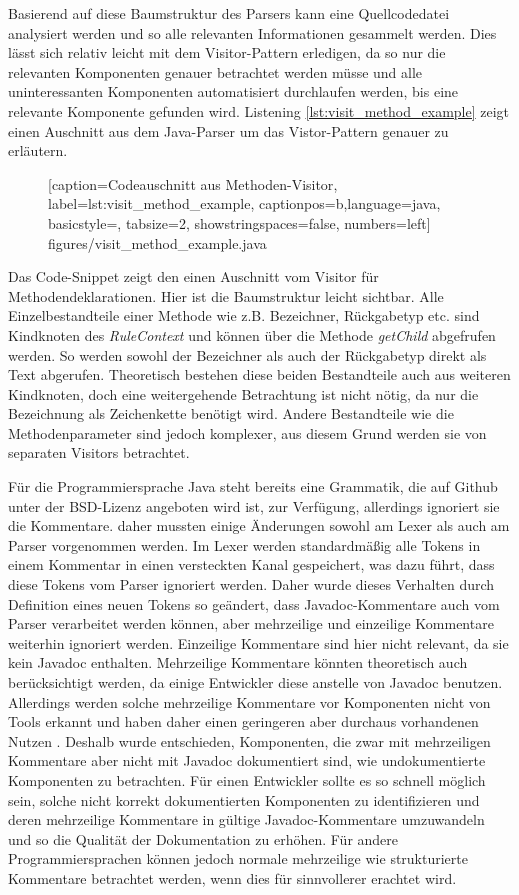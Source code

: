 Basierend auf diese Baumstruktur des Parsers kann eine Quellcodedatei analysiert werden und so alle relevanten Informationen gesammelt werden. Dies lässt sich relativ leicht mit dem Visitor-Pattern erledigen, da so nur die relevanten  Komponenten genauer betrachtet werden müsse und alle uninteressanten Komponenten automatisiert durchlaufen werden, bis eine relevante Komponente gefunden wird. Listening \ref{lst:visit_method_example} zeigt einen Auschnitt aus dem Java-Parser um das Vistor-Pattern genauer zu erläutern. 
		\begin{figure} [htbp]
			
			[caption={Codeauschnitt aus  Methoden-Visitor},
			label={lst:visit_method_example},
			captionpos=b,language=java, basicstyle=\footnotesize, tabsize=2, showstringspaces=false,  numbers=left]
			{figures/visit_method_example.java}
		\end{figure}
Das Code-Snippet zeigt den einen Auschnitt vom Visitor für Methodendeklarationen. Hier ist die Baumstruktur leicht sichtbar. Alle Einzelbestandteile einer Methode wie z.B. Bezeichner, Rückgabetyp etc. sind Kindknoten des \textit{RuleContext} und können über die Methode \textit{getChild} abgefrufen werden. So werden sowohl der Bezeichner als auch der Rückgabetyp direkt als Text abgerufen. Theoretisch bestehen diese beiden Bestandteile auch aus weiteren Kindknoten, doch eine weitergehende Betrachtung ist nicht nötig, da nur die Bezeichnung als Zeichenkette benötigt wird. Andere Bestandteile wie die Methodenparameter sind jedoch komplexer, aus diesem Grund werden sie von separaten Visitors betrachtet. 

Für die Programmiersprache Java steht bereits eine Grammatik, die auf Github unter der BSD-Lizenz angeboten wird ist, zur Verfügung\cite{antlr_grammar_github}, allerdings ignoriert sie die Kommentare. daher mussten einige Änderungen sowohl am Lexer als auch am Parser vorgenommen werden. Im Lexer werden standardmäßig alle Tokens in einem Kommentar in einen versteckten Kanal gespeichert, was dazu führt, dass diese Tokens vom Parser ignoriert werden. Daher wurde dieses Verhalten durch Definition eines neuen Tokens so geändert, dass Javadoc-Kommentare auch vom Parser verarbeitet werden können, aber mehrzeilige und einzeilige Kommentare weiterhin ignoriert werden. Einzeilige Kommentare sind hier nicht relevant, da sie kein Javadoc enthalten. Mehrzeilige Kommentare könnten theoretisch auch berücksichtigt werden, da einige Entwickler diese anstelle von Javadoc benutzen. Allerdings werden solche mehrzeilige Kommentare vor Komponenten nicht von Tools erkannt und haben daher einen geringeren aber durchaus vorhandenen Nutzen \cite[S. 4]{HowDocumentationEvolvesoverTime}. Deshalb wurde entschieden, Komponenten, die zwar mit mehrzeiligen Kommentare aber nicht mit Javadoc dokumentiert sind, wie undokumentierte Komponenten zu betrachten. Für einen Entwickler sollte es so schnell möglich sein, solche nicht korrekt dokumentierten Komponenten zu identifizieren und deren mehrzeilige Kommentare in gültige Javadoc-Kommentare umzuwandeln und so die Qualität der Dokumentation zu erhöhen. Für andere Programmiersprachen können jedoch normale mehrzeilige wie strukturierte Kommentare betrachtet werden, wenn dies für sinnvollerer erachtet wird.  

